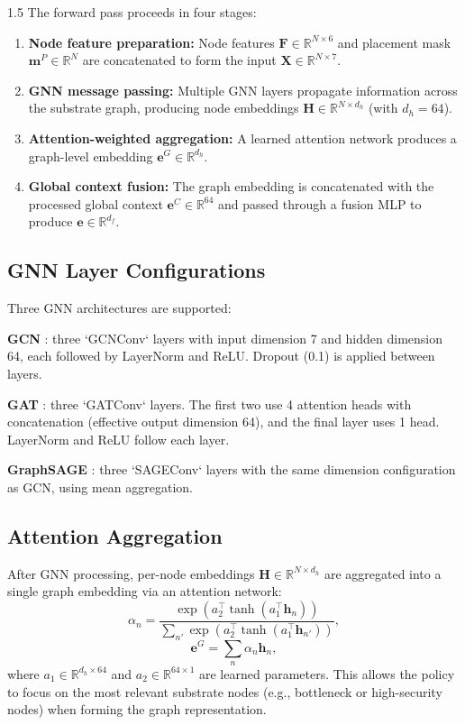 \documentclass[A4paper,12pt]{report}
\theoremstyle{plain}
\theoremstyle{definition}
\theoremstyle{remark}
\numberwithin{equation}{section}
\begin{document}
\begin{spacing}{1.5}
The forward pass proceeds in four stages:

\begin{enumerate}
  \item \textbf{Node feature preparation:} Node features $\mathbf{F} \in \mathbb{R}^{N \times 6}$ and placement mask $\mathbf{m}^P \in \mathbb{R}^N$ are concatenated to form the input $\mathbf{X} \in \mathbb{R}^{N \times 7}$.
  \item \textbf{GNN message passing:} Multiple GNN layers propagate information across the substrate graph, producing node embeddings $\mathbf{H} \in \mathbb{R}^{N \times d_h}$ (with $d_h = 64$).
  \item \textbf{Attention-weighted aggregation:} A learned attention network produces a graph-level embedding $\mathbf{e}^G \in \mathbb{R}^{d_h}$.
  \item \textbf{Global context fusion:} The graph embedding is concatenated with the processed global context $\mathbf{e}^C \in \mathbb{R}^{64}$ and passed through a fusion MLP to produce $\mathbf{e} \in \mathbb{R}^{d_f}$.
\end{enumerate}

\subsection{GNN Layer Configurations}

Three GNN architectures are supported:

\textbf{GCN} \cite{kipf2017}: three `GCNConv` layers with input dimension 7 and hidden dimension 64, each followed by LayerNorm and ReLU. Dropout (0.1) is applied between layers.

\textbf{GAT} \cite{velickovic2018}: three `GATConv` layers. The first two use 4 attention heads with concatenation (effective output dimension 64), and the final layer uses 1 head. LayerNorm and ReLU follow each layer.

\textbf{GraphSAGE} \cite{hamilton2017}: three `SAGEConv` layers with the same dimension configuration as GCN, using mean aggregation.

\subsection{Attention Aggregation}

After GNN processing, per-node embeddings $\mathbf{H} \in \mathbb{R}^{N \times d_h}$ are aggregated into a single graph embedding via an attention network:
\begin{equation}
\alpha_n = \frac{\exp\!\left(a_2^\top \tanh(a_1^\top \mathbf{h}_n)\right)}{\sum_{n'} \exp\!\left(a_2^\top \tanh(a_1^\top \mathbf{h}_{n'})\right)},
\end{equation}
\begin{equation}
\mathbf{e}^G = \sum_n \alpha_n \mathbf{h}_n,
\end{equation}
where $a_1 \in \mathbb{R}^{d_h \times 64}$ and $a_2 \in \mathbb{R}^{64 \times 1}$ are learned parameters. This allows the policy to focus on the most relevant substrate nodes (e.g., bottleneck or high-security nodes) when forming the graph representation.


\end{spacing}
\end{document}

